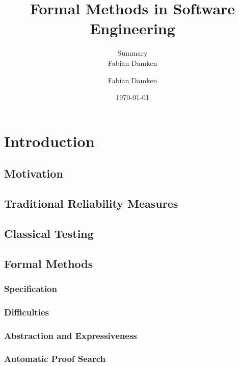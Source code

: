 \documentclass[a4paper, 11pt, accentcolor = tud3b]{tudreport}
\title{Formal Methods in Software Engineering}
\subtitle{Summary \\ Fabian Damken}
\author{Fabian Damken}
\date{\today}
\begin{document}
	\maketitle
	\tableofcontents
	\listoftodos

	\chapter{Introduction}
		\section{Motivation} %

		\section{Traditional Reliability Measures} %

		\section{Classical Testing} %

		\section{Formal Methods} %

			\subsection{Specification} %

			\subsection{Difficulties} %

			\subsection{Abstraction and Expressiveness} %

			\subsection{Automatic Proof Search} %
\end{document}
